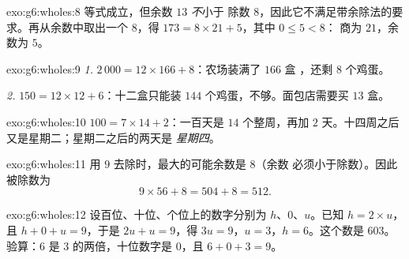 \begin{solution}{exo:g6:wholes:8}
等式成立，但余数 $13$ \emph{不}小于
除数 $8$，因此它不满足带余除法的要求。再从余数中取出一个
$8$，得 $173 = 8 \times 21 + 5$，其中 $0 \leq 5 < 8$：
商为 $21$，余数为 $5$。
\end{solution}

\begin{solution}{exo:g6:wholes:9}
\emph{1.} $2\,000 = 12 \times 166 + 8$：农场装满了 $166$ 盒
，还剩 $8$ 个鸡蛋。

\emph{2.} $150 = 12 \times 12 + 6$：十二盒只能装 $144$
个鸡蛋，不够。面包店需要买 $13$ 盒。
\end{solution}

\begin{solution}{exo:g6:wholes:10}
$100 = 7 \times 14 + 2$：一百天是 $14$ 个整周，再加 $2$
天。十四周之后又是星期二；星期二之后的两天是
\emph{星期四}。
\end{solution}

\begin{solution}{exo:g6:wholes:11}
用 $9$ 去除时，最大的可能余数是 $8$（余数
必须小于除数）。因此被除数为
\[
9 \times 56 + 8 = 504 + 8 = 512 .
\]
\end{solution}

\begin{solution}{exo:g6:wholes:12}
设百位、十位、个位上的数字分别为 $h$、$0$、$u$。已知
$h = 2 \times u$，且 $h + 0 + u = 9$，于是 $2u + u = 9$，得
$3u = 9$，$u = 3$，$h = 6$。这个数是 $603$。验算：$6$ 是
$3$ 的两倍，十位数字是 $0$，且 $6 + 0 + 3 = 9$。
\end{solution}

